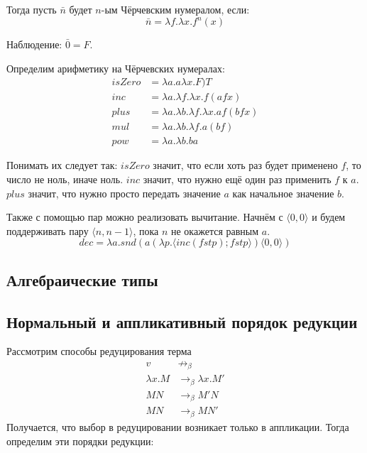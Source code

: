 Тогда пусть $\bar{n}$ будет $n$-ым Чёрчевским нумералом, если:
\begin{equation}
\bar{n} = \lambda f . \lambda x . f^n(x)
\end{equation}

Наблюдение: $\bar{0} = F$.

Определим арифметику на Чёрчевских нумералах:
\begin{align*}
isZero &= \lambda a . a \lambda x . F) T \\
inc &= \lambda a . \lambda f . \lambda x . f (a f x) \\
plus &= \lambda a . \lambda  b . \lambda f . \lambda x . a f (b f x) \\
mul &= \lambda a . \lambda b . \lambda f . a (b f) \\
pow &= \lambda a . \lambda b . b a
\end{align*}

Понимать их следует так: $isZero$ значит, что если хоть раз будет применено $f$, 
то число не ноль, иначе ноль. $inc$ значит, что нужно ещё
один раз применить $f$ к $a$. $plus$ значит, что нужно просто передать значение
$a$ как начальное значение $b$.

Также с помощью пар можно реализовать вычитание. Начнём с $\langle 0, 0 \rangle$ и будем
поддерживать пару $\langle n, n - 1 \rangle$, пока $n$ не окажется равным $a$.
\begin{equation}
dec = \lambda a . snd (a (\lambda p . \langle inc (fst p); fst p \rangle ) \langle 0, 0 \rangle )
\end{equation}

\subsection{Алгебраические типы}
\label{sec-3-4}


\subsection{Нормальный и аппликативный порядок редукции}
\label{sec-3-5}
Рассмотрим способы редуцирования терма
\begin{align*}
v &\not\rightarrow_\beta \\
\lambda x . M &\rightarrow_\beta \lambda x . M' \\
M N &\rightarrow_\beta M' N \\
M N &\rightarrow_\beta M N'
\end{align*}
Получается, что выбор в редуцировании возникает только в аппликации. Тогда
определим эти порядки редукции:

